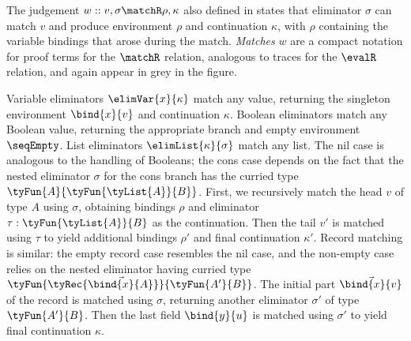 The judgement $w :: v, \sigma \matchR \rho, \kappa$ also defined in  states that eliminator $\sigma$ can match $v$ and produce environment $\rho$ and continuation $\kappa$, with $\rho$ containing the variable bindings that arose during the match. \emph{Matches} $w$ are a compact notation for proof terms for the $\matchR$ relation, analogous to traces for the $\evalR$ relation, and again appear in grey in the figure.

Variable eliminators $\elimVar{x}{\kappa}$ match any value, returning the singleton environment $\bind{x}{v}$ and continuation $\kappa$. Boolean eliminators match any Boolean value, returning the appropriate branch and empty environment $\seqEmpty$. List eliminators $\elimList{\kappa}{\sigma}$ match any list. The nil case is analogous to the handling of Booleans; the cons case depends on the fact that the nested eliminator $\sigma$ for the cons branch has the curried type $\tyFun{A}{\tyFun{\tyList{A}}{B}}$. First, we recursively match the head $v$ of type $A$ using $\sigma$, obtaining bindings $\rho$ and eliminator $\tau: \tyFun{\tyList{A}}{B}$ as the continuation. Then the tail $v'$ is matched using $\tau$ to yield additional bindings $\rho'$ and final continuation $\kappa'$. Record matching is similar: the empty record case resembles the nil case, and the non-empty case relies on the nested eliminator having curried type $\tyFun{\tyRec{\vec{\bind{x}{A}}}}{\tyFun{A'}{B}}$. The initial part $\vec{\bind{x}{v}}$ of the record is matched using $\sigma$, returning another eliminator $\sigma'$ of type $\tyFun{A'}{B}$. Then the last field $\bind{y}{u}$ is matched using $\sigma'$ to yield final continuation $\kappa$.
